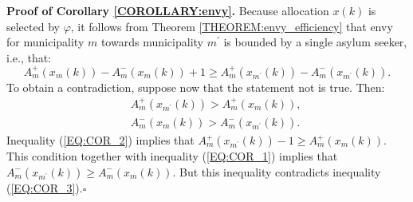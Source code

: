 \documentclass[12pt,fleqn]{article}
\begin{document}
\noindent\textbf{Proof of Corollary \ref{COROLLARY:envy}.} Because allocation $x(k)$ is selected by $\varphi$, it follows from Theorem \ref{THEOREM:envy_efficiency} that envy for municipality $m$ towards municipality $m^\prime$ is bounded by a single asylum seeker, i.e., that:
\begin{equation}
A_m^+(x_m(k))-A_m^-(x_m(k))+1\geq A_m^+(x_{m^\prime}(k))-A_m^-(x_{m^\prime}(k)).\label{EQ:COR_1}
\end{equation}
\noindent To obtain a contradiction, suppose now that the statement not is true. Then:
\begin{eqnarray}
&& A_m^+(x_{m^\prime}(k))>A_m^+(x_m(k)),\label{EQ:COR_2} \\
&& A_m^-(x_m(k))>A_m^-(x_{m^\prime}(k)).\label{EQ:COR_3}
\end{eqnarray}
\noindent Inequality (\ref{EQ:COR_2}) implies that $A_m^+(x_{m^\prime}(k))-1\geq A_m^+(x_m(k))$. This condition together with inequality (\ref{EQ:COR_1}) implies that $A_m^-(x_{m^\prime}(k))\geq A_m^-(x_m(k))$. But this inequality contradicts inequality (\ref{EQ:COR_3}).\hfill $\square$
\end{document}

